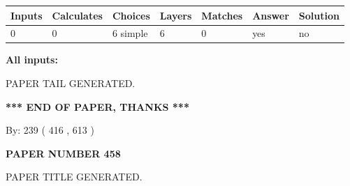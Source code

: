 \documentclass{ctexart}
\begin{document}
 
   
   
   
   
\noindent\begin{tabular}{|l|l|l|l|l|l|l|}
 \hline
Inputs & Calculates & Choices & Layers & Matches & Answer & Solution \\ \hline
 0  & 
 0  & 
 6
  simple  
  & 
 6  & 
 0  & 
  yes & 
  no 
  \\ \hline
 \end{tabular}
   
   
   
   
\noindent{}
   
   
   
   
\noindent\vspace{0.1in}\hspace{-0.08in} {\textbf{\Large{All inputs: }}}
   
   
   
   
   
   
 \vspace{0.2in}
 
   
   
\vspace{2.0in} PAPER TAIL GENERATED.
   
   
   
   
\vspace{1.0in} 
{\textbf{\large{ *** END OF PAPER, THANKS *** }}} 
   
   
\hspace{1.0in} By: 
 239 ( 416 ,  613 )
   
   
   
   
\newpage 
\setcounter{page}{ 
   458001 } 
   
   
   
   
 {\textbf{ \Large{ PAPER NUMBER  458  }}}
   
   
\vspace{0.2in}
   
   
   
   
   
   
   
   
 \vspace{0.2in}
 
 
 
 
   
   
 PAPER TITLE GENERATED.
   
\end{document}
